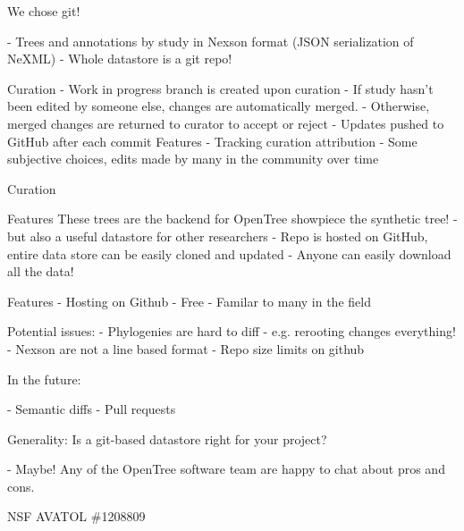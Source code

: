 \documentclass[a4paper,10pt]{article}
\begin{document}
 We chose git!

 - Trees and annotations by study in Nexson format  
(JSON serialization of NeXML)
 - Whole datastore is a git repo!  
 

 Curation
- Work in progress branch is created upon curation  
- If study hasn't been edited by someone else, changes are automatically merged.  
- Otherwise, merged changes are returned to curator to accept or reject
- Updates pushed to GitHub after each commit
 Features
 - Tracking curation attribution  
- Some subjective choices, edits made by many in the community over time

 Curation

 Features
 These trees are the backend for OpenTree showpiece  
 the synthetic tree!
 - but also a useful datastore for other researchers
 - Repo is hosted on GitHub, entire data store can be easily cloned and updated
 - Anyone can easily download all the data!
 
 Features
- Hosting on Github  
- Free  
- Familar to  many in the field


 Potential issues:
 - Phylogenies are hard to diff - e.g. rerooting changes everything!
 - Nexson are not a line based format
 - Repo size limits on github


 In the future:

 - Semantic diffs  
 - Pull requests
 
  
Generality:
Is a git-based datastore right for your project?

 - Maybe! Any of the OpenTree software team are happy to chat about pros and cons.

NSF AVATOL \#1208809  
\end{document}
